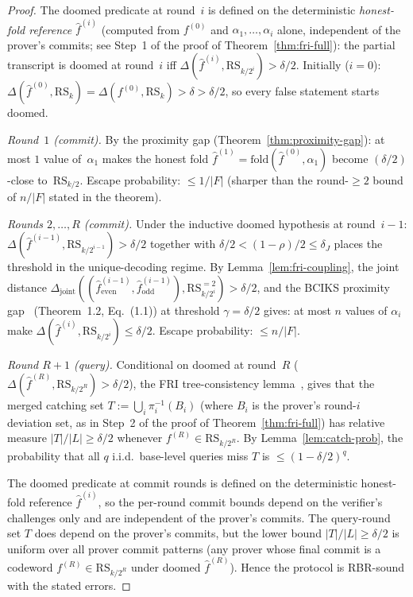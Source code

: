 \documentclass[11pt]{article}
\newcommand{\RS}{\mathrm{RS}}
\begin{document}
\begin{proof}
The doomed predicate at round~$i$ is defined on the deterministic \emph{honest-fold reference} $\hat f^{(i)}$ (computed from $f^{(0)}$ and $\alpha_1, \ldots, \alpha_i$ alone, independent of the prover's commits; see Step~1 of the proof of Theorem~\ref{thm:fri-full}): the partial transcript is doomed at round~$i$ iff $\Delta(\hat f^{(i)}, \RS_{k/2^i}) > \delta/2$.  Initially ($i = 0$): $\Delta(\hat f^{(0)}, \RS_k) = \Delta(f^{(0)}, \RS_k) > \delta > \delta/2$, so every false statement starts doomed.

\emph{Round~$1$ (commit).}  By the proximity gap (Theorem~\ref{thm:proximity-gap}): at most $1$ value of~$\alpha_1$ makes the honest fold $\hat f^{(1)} = \mathrm{fold}(\hat f^{(0)}, \alpha_1)$ become $(\delta/2)$-close to~$\RS_{k/2}$.  Escape probability: $\leq 1/|F|$ (sharper than the round-$\geq 2$ bound of $n/|F|$ stated in the theorem).

\emph{Rounds $2, \ldots, R$ (commit).}  Under the inductive doomed hypothesis at round~$i{-}1$: $\Delta(\hat f^{(i-1)}, \RS_{k/2^{i-1}}) > \delta/2$ together with $\delta/2 < (1{-}\rho)/2 \leq \delta_J$ places the threshold in the unique-decoding regime.  By Lemma~\ref{lem:fri-coupling}, the joint distance $\Delta_{\mathrm{joint}}((\hat f^{(i-1)}_{\mathrm{even}}, \hat f^{(i-1)}_{\mathrm{odd}}), \RS_{k/2^i}^{=2}) > \delta/2$, and the BCIKS proximity gap~\cite{BCIKS} (Theorem~1.2, Eq.~(1.1)) at threshold $\gamma = \delta/2$ gives: at most $n$ values of $\alpha_i$ make $\Delta(\hat f^{(i)}, \RS_{k/2^i}) \leq \delta/2$.  Escape probability: $\leq n/|F|$.

\emph{Round $R{+}1$ (query).}  Conditional on doomed at round~$R$ ($\Delta(\hat f^{(R)}, \RS_{k/2^R}) > \delta/2$), the FRI tree-consistency lemma~\cite[\S6]{BBHR}, \cite[Lemma~8.2]{BCIKS} gives that the merged catching set $T := \bigcup_i \pi_i^{-1}(B_i)$ (where $B_i$ is the prover's round-$i$ deviation set, as in Step~2 of the proof of Theorem~\ref{thm:fri-full}) has relative measure $|T|/|L| \geq \delta/2$ whenever $f^{(R)} \in \RS_{k/2^R}$.  By Lemma~\ref{lem:catch-prob}, the probability that all $q$ i.i.d.\ base-level queries miss $T$ is $\leq (1 - \delta/2)^q$.

The doomed predicate at commit rounds is defined on the deterministic honest-fold reference $\hat f^{(i)}$, so the per-round commit bounds depend on the verifier's challenges only and are independent of the prover's commits.  The query-round set $T$ does depend on the prover's commits, but the lower bound $|T|/|L| \geq \delta/2$ is uniform over all prover commit patterns (any prover whose final commit is a codeword $f^{(R)} \in \RS_{k/2^R}$ under doomed $\hat f^{(R)}$). Hence the protocol is RBR-sound with the stated errors.
\end{proof}
\end{document}
